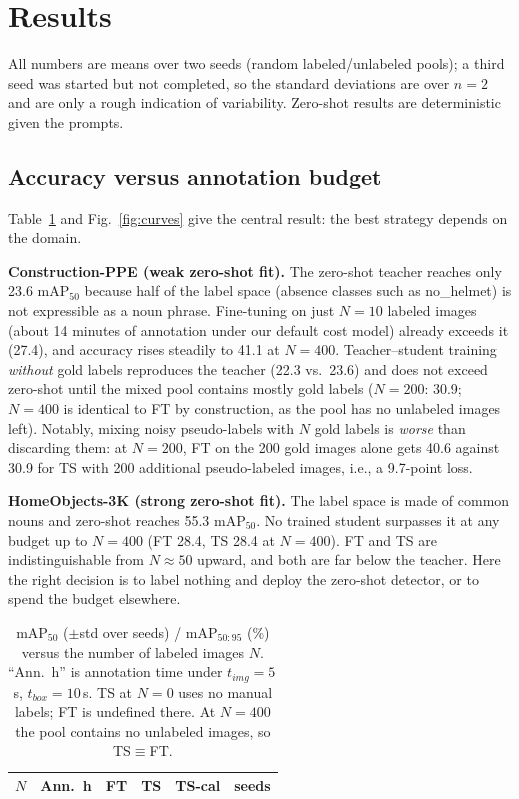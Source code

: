 \section{Results}
All numbers are means over two seeds (random labeled/unlabeled pools); a third seed was started but not completed, so the standard deviations are over $n{=}2$ and are only a rough indication of variability. Zero-shot results are deterministic given the prompts.

\subsection{Accuracy versus annotation budget}
Table~\ref{tab:main} and Fig.~\ref{fig:curves} give the central result: the best strategy depends on the domain.

\textbf{Construction-PPE (weak zero-shot fit).} The zero-shot teacher reaches only 23.6 mAP$_{50}$ because half of the label space (absence classes such as no\_helmet) is not expressible as a noun phrase. Fine-tuning on just $N{=}10$ labeled images (about 14 minutes of annotation under our default cost model) already exceeds it (27.4), and accuracy rises steadily to 41.1 at $N{=}400$. Teacher--student training \emph{without} gold labels reproduces the teacher (22.3 vs.\ 23.6) and does not exceed zero-shot until the mixed pool contains mostly gold labels ($N{=}200$: 30.9; $N{=}400$ is identical to FT by construction, as the pool has no unlabeled images left). Notably, mixing noisy pseudo-labels with $N$ gold labels is \emph{worse} than discarding them: at $N{=}200$, FT on the 200 gold images alone gets 40.6 against 30.9 for TS with 200 additional pseudo-labeled images, i.e., a 9.7-point loss.

\textbf{HomeObjects-3K (strong zero-shot fit).} The label space is made of common nouns and zero-shot reaches 55.3 mAP$_{50}$. No trained student surpasses it at any budget up to $N{=}400$ (FT 28.4, TS 28.4 at $N{=}400$). FT and TS are indistinguishable from $N{\approx}50$ upward, and both are far below the teacher. Here the right decision is to label nothing and deploy the zero-shot detector, or to spend the budget elsewhere.

\begin{table}[t]
\caption{mAP$_{50}$ ($\pm$std over seeds) / mAP$_{50:95}$ (\%) versus the number of labeled images $N$. ``Ann.\ h'' is annotation time under $t_{img}{=}5$\,s, $t_{box}{=}10$\,s. TS at $N{=}0$ uses no manual labels; FT is undefined there. At $N{=}400$ the pool contains no unlabeled images, so TS$\equiv$FT.}
\label{tab:main}
\centering\scriptsize
\setlength{\tabcolsep}{2.5pt}
\begin{tabular}{rrcccc}
\toprule
$N$ & Ann.\ h & FT & TS & TS-cal & seeds\\
\midrule

\bottomrule
\end{tabular}
\end{table}

